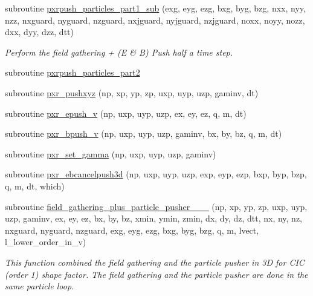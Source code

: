 \begin{DoxyCompactItemize}
subroutine \hyperlink{particles__push_8_f90_a118ee5e2cb33e26a0bdd1db0f93a7fdd}{pxrpush\+\_\+particles\+\_\+part1\+\_\+sub} (exg, eyg, ezg, bxg, byg, bzg, nxx, nyy, nzz, nxguard, nyguard, nzguard, nxjguard, nyjguard, nzjguard, noxx, noyy, nozz, dxx, dyy, dzz, dtt)
\begin{DoxyCompactList}\small\item\em Perform the field gathering + (E \& B) Push half a time step. \end{DoxyCompactList}\item 
subroutine \hyperlink{particles__push_8_f90_ab65aba49863198b09c221d6bf6a8f6bc}{pxrpush\+\_\+particles\+\_\+part2}
\item 
subroutine \hyperlink{particles__push_8_f90_aa77ade6c16b80186ff4ba5e899c70848}{pxr\+\_\+pushxyz} (np, xp, yp, zp, uxp, uyp, uzp, gaminv, dt)
\item 
subroutine \hyperlink{particles__push_8_f90_ad3b68e848193f6e2e6adb95490c79ea3}{pxr\+\_\+epush\+\_\+v} (np, uxp, uyp, uzp, ex, ey, ez, q, m, dt)
\item 
subroutine \hyperlink{particles__push_8_f90_a7ea5e15ca81ac196298e046dec12e3b9}{pxr\+\_\+bpush\+\_\+v} (np, uxp, uyp, uzp, gaminv, bx, by, bz, q, m, dt)
\item 
subroutine \hyperlink{particles__push_8_f90_ad4471b8d19a27dc1e15683c68c2452d2}{pxr\+\_\+set\+\_\+gamma} (np, uxp, uyp, uzp, gaminv)
\item 
subroutine \hyperlink{particles__push_8_f90_a33af2f46aea122dab559b97c7de2f5f5}{pxr\+\_\+ebcancelpush3d} (np, uxp, uyp, uzp, exp, eyp, ezp, bxp, byp, bzp, q, m, dt, which)
\item 
subroutine \hyperlink{particles__push_8_f90_af9cba768132f6e7e5d6a39108c2c4118}{field\+\_\+gathering\+\_\+plus\+\_\+particle\+\_\+pusher\+\_\+\_\+\_} (np, xp, yp, zp, uxp, uyp, uzp, gaminv,                                                                                                                                                   ex, ey, ez, bx, by, bz, xmin, ymin, zmin,                                                                                                                                                           dx, dy, dz, dtt, nx, ny, nz, nxguard, nyguard, nzguard,                                                                                                                                                   exg, eyg, ezg, bxg, byg, bzg, q, m, lvect, l\+\_\+lower\+\_\+order\+\_\+in\+\_\+v)
\begin{DoxyCompactList}\small\item\em This function combined the field gathering and the particle pusher in 3D for C\+IC (order 1) shape factor. The field gathering and the particle pusher are done in the same particle loop. \end{DoxyCompactList}\item 

\end{DoxyCompactItemize}
